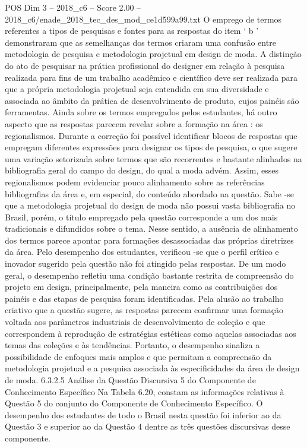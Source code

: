 \begin{textsample}{POS Dim 3 – 2018\_c6 – Score 2.00 – 2018\_c6/enade\_2018\_tec\_des\_mod\_ce1d599a99.txt}
O emprego de termos referentes a tipos de pesquisas e fontes para as respostas do item ‘ b ’ demonstraram que as semelhanças dos termos criaram uma confusão entre metodologia de pesquisa e metodologia projetual em design de moda.
A distinção do ato de pesquisar na prática profissional do designer em relação à pesquisa realizada para fins de um trabalho acadêmico e científico deve ser realizada para que a própria metodologia projetual seja entendida em sua diversidade e associada ao âmbito da prática de desenvolvimento de produto, cujos painéis são ferramentas.
Ainda sobre os termos empregados pelos estudantes, há outro aspecto que as respostas parecem revelar sobre a formação na área : os regionalismos.
Durante a correção foi possível identificar blocos de respostas que empregam diferentes expressões para designar os tipos de pesquisa, o que sugere uma variação setorizada sobre termos que são recorrentes e bastante alinhados na bibliografia geral do campo do design, do qual a moda advém.
Assim, esses regionalismos podem evidenciar pouco alinhamento sobre as referências bibliografias da área e, em especial, do conteúdo abordado na questão.
Sabe -se que a metodologia projetual do design de moda não possui vasta bibliografia no Brasil, porém, o título empregado pela questão corresponde a um dos mais tradicionais e difundidos sobre o tema.
Nesse sentido, a ausência de alinhamento dos termos parece apontar para formações desassociadas das próprias diretrizes da área.
Pelo desempenho dos estudantes, verificou -se que o perfil crítico e inovador sugerido pela questão não foi atingido pelas respostas.
De um modo geral, o desempenho refletiu uma condição bastante restrita de compreensão do projeto em design, principalmente, pela maneira como as contribuições dos painéis e das etapas de pesquisa foram identificadas.
Pela alusão ao trabalho criativo que a questão sugere, as respostas parecem confirmar uma formação voltada aos parâmetros industriais de desenvolvimento de coleção e que correspondem à reprodução de estratégias estéticas como aquelas associadas aos temas das coleções e às tendências.
Portanto, o desempenho sinaliza a possibilidade de enfoques mais amplos e que permitam a compreensão da metodologia projetual e a pesquisa associada às especificidades da área de design de moda. 6.3.2.5 Análise da Questão Discursiva 5 do Componente de Conhecimento Específico Na Tabela 6.20, constam as informações relativas à Questão 5 do conjunto do Componente de Conhecimento Específico.
O desempenho dos estudantes de todo o Brasil nesta questão foi inferior ao da Questão 3 e superior ao da Questão 4 dentre as três questões discursivas desse componente.

\end{textsample}
